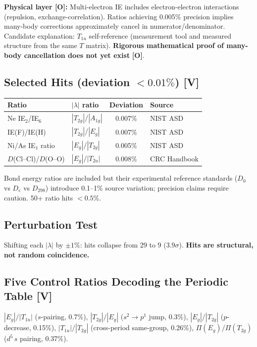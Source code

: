 \documentclass[11pt,a4paper]{article}
\newcommand{\gradeV}{\textbf{[V]}}
\newcommand{\gradeO}{\textbf{[O]}}
\begin{document}
\textbf{Physical layer \gradeO:} Multi-electron IE includes electron-electron interactions (repulsion, exchange-correlation). Ratios achieving 0.005\% precision implies many-body corrections approximately cancel in numerator/denominator. Candidate explanation: $T_{1u}$ self-reference (measurement tool and measured structure from the same $T$ matrix). \textbf{Rigorous mathematical proof of many-body cancellation does not yet exist} \gradeO.

\subsection{Selected Hits (deviation ${<}0.01\%$) \gradeV}
\begin{center}
\begin{tabular}{llcl}
\toprule
Ratio & $|\lambda|$ ratio & Deviation & Source \\
\midrule
Ne IE$_2$/IE$_6$ & $|T_{2g}|/|A_{1g}|$ & 0.007\% & NIST ASD~\cite{NIST} \\
IE(F)/IE(H) & $|T_{2g}|/|E_g|$ & 0.007\% & NIST ASD \\
Ni/As IE$_1$ ratio & $|E_g|/|T_{2g}|$ & 0.005\% & NIST ASD \\
$D$(Cl--Cl)/$D$(O--O) & $|E_g|/|T_{2u}|$ & 0.008\% & CRC Handbook \\
\bottomrule
\end{tabular}
\end{center}

Bond energy ratios are included but their experimental reference standards ($D_0$ vs $D_e$ vs $D_{298}$) introduce 0.1--1\% source variation; precision claims require caution. 50+ ratio hits ${<}0.5\%$.

\subsection{Perturbation Test}
Shifting each $|\lambda|$ by $\pm 1\%$: hits collapse from 29 to 9 ($3.9\sigma$). \textbf{Hits are structural, not random coincidence.}

\subsection{Five Control Ratios Decoding the Periodic Table \gradeV}
$|E_g|/|T_{1u}|$ ($s$-pairing, 0.7\%), $|T_{2g}|/|E_g|$ ($s^2\to p^1$ jump, 0.3\%), $|E_g|/|T_{2g}|$ ($p$-decrease, 0.15\%), $|T_{1u}|/|T_{2g}|$ (cross-period same-group, 0.26\%), $\Pi(E_g)/\Pi(T_{2g})$ ($d^5\,s$ pairing, 0.37\%).
\end{document}
